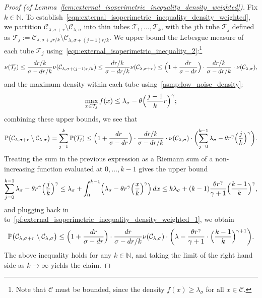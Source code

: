 \documentclass{article}
\newcommand{\1}{\mathbf{1}}
\newcommand{\mc}[1]{\mathcal{#1}}
\newcommand{\Pbb}{\mathbb{P}}
\theoremstyle{definition}
\theoremstyle{remark}
\begin{document}
\begin{proof}[Proof (of Lemma~\ref{lem:external_isoperimetric_inequality_density_weighted})]
	Fix $k \in \mathbb{N}$. To establish~\eqref{eqn:external_isoperimetric_inequality_density_weighted}, we partition $\mc{C}_{\lambda,\sigma + r} \setminus \mc{C}_{\lambda,\sigma}$ into thin tubes $\mc{T}_{1},\ldots,\mc{T}_{k}$, with the $j$th tube $\mc{T}_j$ defined as $\mc{T}_j := \mc{C}_{\lambda,\sigma + jr/k} \setminus \mc{C}_{\lambda,\sigma + (j - 1)r/k}.$ We upper bound the Lebesgue measure of each tube $\mc{T}_j$ using~\eqref{eqn:external_isoperimetric_inequality_2}:\footnote{Note that $\mc{C}$ must be bounded, since the density $f(x) \geq \lambda_{\sigma}$ for all $x \in \mc{C}$.}
	\begin{equation*}
	\nu(\mc{T}_j) \leq \frac{dr/k}{\sigma - dr/k} \nu(\mc{C}_{\lambda,\sigma + (j - 1)r/k}) \leq \frac{dr/k}{\sigma - dr/k} \nu(\mc{C}_{\lambda,\sigma + r}) \leq \Bigl(1 + \frac{dr}{\sigma - dr}\Bigr) \cdot \frac{dr/k}{\sigma - dr/k}  \cdot \nu(\mc{C}_{\lambda,\sigma}),
	\end{equation*}
	and the maximum density within each tube using~\ref{asmp:low_noise_density}:
	\begin{equation*}
	\max_{x \in \mc{T}_j} f(x) \leq \lambda_{\sigma} - \theta \Bigl(\frac{j - 1}{k}r\Bigr)^{\gamma};
	\end{equation*}
	combining these upper bounds, we see that
	\begin{equation}
	\label{pf:external_isoperimetric_inequality_density_weighted_1}
	\Pbb\bigl(\mc{C}_{\lambda,\sigma + r} \setminus \mc{C}_{\lambda,\sigma}\bigr) = \sum_{j = 1}^{k} \Pbb(\mc{T}_j) \leq \Bigl(1 + \frac{dr}{\sigma - dr}\Bigr) \cdot  \frac{dr/k}{\sigma - dr/k} \cdot \nu(\mc{C}_{\lambda,\sigma}) \cdot \biggl(\sum_{j = 0}^{k - 1}\lambda_{\sigma} -  \theta r^{\gamma} \Bigl(\frac{j}{k}\Bigr)^{\gamma} \biggr).
	\end{equation}
	Treating the sum in the previous expression as a Riemann sum of a non-increasing function evaluated at $0,\ldots,k -1$ gives the upper bound
	\begin{equation*}
	\sum_{j = 0}^{k - 1}\lambda_{\sigma} -  \theta r^{\gamma} \Bigl(\frac{j}{k}\Bigr)^{\gamma } \leq \lambda_{\sigma} + \int_{0}^{k - 1} \Bigl(\lambda_{\sigma} -  \theta r^{\gamma} \Bigl(\frac{x}{k}\Bigr)^{\gamma}\Bigr) \,dx \leq k\lambda_{\sigma} + (k - 1)\frac{\theta r^{\gamma}}{\gamma + 1} \Bigl(\frac{k - 1}{k}\Bigr)^{\gamma},
	\end{equation*}
	and plugging back in to~\eqref{pf:external_isoperimetric_inequality_density_weighted_1}, we obtain
	\begin{equation*}
	\Pbb\bigl(\mc{C}_{\lambda,\sigma + r} \setminus \mc{C}_{\lambda,\sigma}\bigr) \leq  \Bigl(1 + \frac{dr}{\sigma - dr}\Bigr) \cdot \frac{dr}{\sigma - dr/k} \nu(\mc{C}_{\lambda,\sigma}) \cdot \biggl(\lambda - \frac{\theta r^{\gamma}}{\gamma + 1} \cdot \Bigl(\frac{k - 1}{k}\Bigr)^{\gamma + 1} \biggl).
	\end{equation*}
	The above inequality holds for any $k \in \mathbb{N}$, and taking the limit of the right hand side as $k \to \infty$ yields the claim.
\end{proof}
\end{document}
